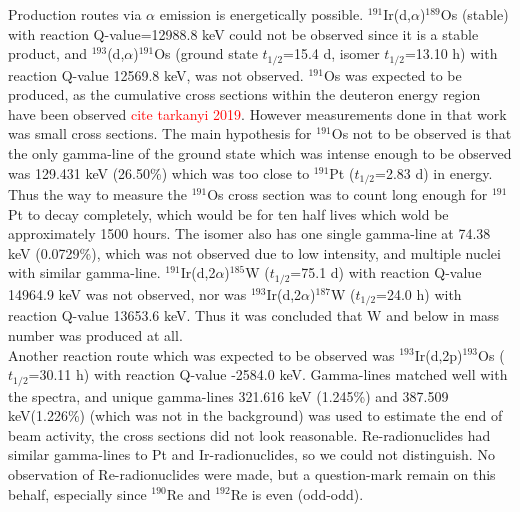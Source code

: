 \noindent 
Production routes via $\alpha$ emission is energetically possible.  $^{191}$Ir(d,$\alpha$)$^{189}$Os (stable) with reaction Q-value=12988.8 keV could not be observed since it is a stable product, and $^{193}$(d,$\alpha$)$^{191}$Os (ground state $t_{1/2}$=15.4 d, isomer $t_{1/2}$=13.10 h) with reaction Q-value 12569.8 keV, was not observed. $^{191}$Os was expected to be produced, as the cumulative cross sections within the deuteron energy region have been observed \textcolor{red}{cite tarkanyi 2019}. However measurements done in that work was small cross sections. The main hypothesis for $^{191}$Os not to be observed is that the only gamma-line of the ground state which was intense enough to be observed was 129.431 keV (26.50\%) which was too close to $^{191}$Pt ($t_{1/2}$=2.83 d) in energy. Thus the way to measure the $^{191}$Os cross section was to count long enough for $^{191}$Pt to decay completely, which would be for ten half lives which wold be approximately 1500 hours. The isomer also has one single gamma-line at 74.38 keV (0.0729\%), which was not observed due to low intensity, and multiple nuclei with similar gamma-line. $^{191}$Ir(d,2$\alpha$)$^{185}$W ($t_{1/2}$=75.1 d) with reaction Q-value 14964.9 keV was not observed, nor was $^{193}$Ir(d,2$\alpha$)$^{187}$W ($t_{1/2}$=24.0 h) with reaction Q-value 13653.6 keV. Thus it was concluded that W and below in mass number was produced at all. \\

\noindent 
Another reaction route which was expected to be observed was $^{193}$Ir(d,2p)$^{193}$Os ($t_{1/2}$=30.11 h) with reaction Q-value -2584.0 keV. Gamma-lines matched well with the spectra, and unique gamma-lines 321.616 keV (1.245\%) and 387.509 keV(1.226\%) (which was not in the background) was used to estimate the end of beam activity, the cross sections did not look reasonable. Re-radionuclides had similar gamma-lines to Pt and Ir-radionuclides, so we could not distinguish. No observation of Re-radionuclides were made, but a question-mark remain on this behalf, especially since $^{190}$Re and $^{192}$Re is even (odd-odd).  





